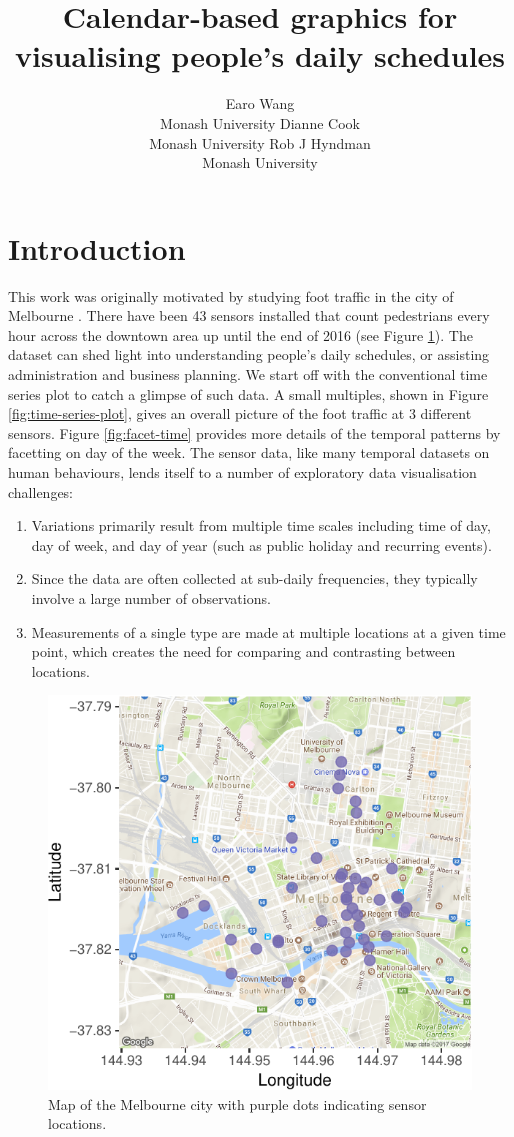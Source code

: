 \documentclass[article]{jss}
\author{
Earo Wang\\Monash University \And Dianne Cook\\Monash University \And Rob J Hyndman\\Monash University
}
\title{Calendar-based graphics for visualising people's daily schedules}
\providecommand{\tightlist}{%
  \setlength{\itemsep}{0pt}\setlength{\parskip}{0pt}}
\begin{document}
\section{Introduction}\label{introduction}

This work was originally motivated by studying foot traffic in the city
of Melbourne \citep{ped}. There have been 43 sensors installed that
count pedestrians every hour across the downtown area up until the end
of 2016 (see Figure \ref{fig:ped-map}). The dataset can shed light into
understanding people's daily schedules, or assisting administration and
business planning. We start off with the conventional time series plot
to catch a glimpse of such data. A small multiples, shown in Figure
\ref{fig:time-series-plot}, gives an overall picture of the foot traffic
at 3 different sensors. Figure \ref{fig:facet-time} provides more
details of the temporal patterns by facetting on day of the week. The
sensor data, like many temporal datasets on human behaviours, lends
itself to a number of exploratory data visualisation challenges:

\begin{enumerate}
\def\labelenumi{\arabic{enumi}.}
\tightlist
\item
  Variations primarily result from multiple time scales including time
  of day, day of week, and day of year (such as public holiday and
  recurring events).
\item
  Since the data are often collected at sub-daily frequencies, they
  typically involve a large number of observations.
\item
  Measurements of a single type are made at multiple locations at a
  given time point, which creates the need for comparing and contrasting
  between locations.
\end{enumerate}

\begin{CodeChunk}
\begin{figure}

{\centering \includegraphics[width=0.55\linewidth]{figure/ped-map-1} 

}

\caption[Map of the Melbourne city with purple dots indicating sensor locations]{Map of the Melbourne city with purple dots indicating sensor locations.}\label{fig:ped-map}
\end{figure}
\end{CodeChunk}
\end{document}
